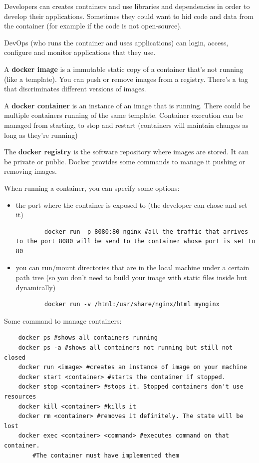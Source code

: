 Developers can creates containers and use libraries and dependencies in order to develop their applications. Sometimes they could want to hid code and data from the container (for example if the code is not open-source).

DevOps (who runs the container and uses applications) can login, access, configure and monitor applications that they use.

A \textbf{docker image} is a immutable static copy of a container that's not running (like a template). You can push or remove images from a registry. There's a tag that discriminates different versions of images.

A \textbf{docker container} is an instance of an image that is running. There could be multiple containers running of the same template.
Container execution can be managed from starting, to stop and restart (containers will maintain changes as long as they're running)

The \textbf{docker registry} is the software repository where images are stored. It can be private or public. Docker provides some commands to manage it pushing or removing images.

When running a container, you can specify some options:
\begin{itemize}
    \item the port where the container is exposed to (the developer can chose and set it)
    \begin{verbatim}
        docker run -p 8080:80 nginx #all the traffic that arrives to the port 8080 will be send to the container whose port is set to 80
    \end{verbatim}
    \item you can run/mount directories that are in the local machine under a certain path tree (so you don't need to build your image with static files inside but dynamically)
    \begin{verbatim}
        docker run -v /html:/usr/share/nginx/html mynginx
    \end{verbatim}
\end{itemize}

Some command to manage containers:
\begin{verbatim}
    docker ps #shows all containers running
    docker ps -a #shows all containers not running but still not closed
    docker run <image> #creates an instance of image on your machine
    docker start <container> #starts the container if stopped.
    docker stop <container> #stops it. Stopped containers don't use resources
    docker kill <container> #kills it
    docker rm <container> #removes it definitely. The state will be lost
    docker exec <container> <command> #executes command on that container.
        #The container must have implemented them
\end{verbatim}

